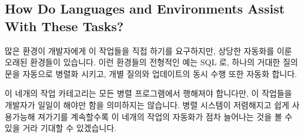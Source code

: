 \fi

\subsection{How Do Languages and Environments Assist With These Tasks?}
\label{sec:intro:How Do Languages and Environments Assist With These Tasks?}

많은 환경이 개발자에게 이 작업들을 직접 하기를 요구하지만, 상당한 자동화를 이룬
오래된 환경들이 있습니다.
이런 환경들의 전형적인 예는 SQL 로, 하나의 거대한 질의문을 자동으로 병렬화
시키고, 개별 질의와 업데이트의 동시 수행 또한 자동화 합니다.

이 네개의 작업 카테고리는 모든 병렬 프로그램에서 행해져야 합니다만, 이 작업들을
개발자가 일일이 해야만 함을 의미하지는 않습니다.
병렬 시스템이 저렴해지고 쉽게 사용가능해 져가기를 계속할수록 이 네개의 작업의
자동화가 점차 늘어나는 것을 볼 수 있을 거라 기대할 수 있겠습니다.

